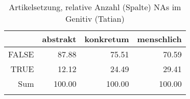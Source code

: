 \begin{table}[ht]
\centering
\begin{tabular}{rrrr}
  \lsptoprule
 & abstrakt & konkretum & menschlich \\ 
  \midrule
FALSE & 87.88 & 75.51 & 70.59 \\ 
  TRUE & 12.12 & 24.49 & 29.41 \\ 
  Sum & 100.00 & 100.00 & 100.00 \\ 
   \lspbottomrule
\end{tabular}
\caption{Artikelsetzung, relative Anzahl (Spalte) NAs im Genitiv (Tatian)} 
\end{table}
